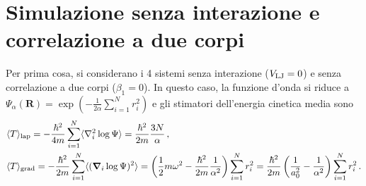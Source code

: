 \documentclass[a4paper, titlepage]{article}
\begin{document}
\section{Simulazione senza interazione e correlazione a due corpi}
Per prima cosa, si considerano i 4 sistemi senza interazione ($V_{\rm LJ} = 0$) e senza correlazione a due corpi ($\beta_1 = 0$). In questo caso, la funzione d'onda si riduce a $\Psi_\alpha(\mathbf{R}) = \exp(-\frac{1}{2\alpha}\sum_{i = 1}^Nr_i^2)$ e gli stimatori dell'energia cinetica media sono
\begin{align*}
    &\langle T \rangle _{\rm lap} = -\frac{\hbar^2}{4m}
    \sum_{i = 1}^N
    \langle\nabla_i^2\log\Psi\rangle = \frac{\hbar^2}{2m} \frac{3N}{\alpha}\, ,\\
    &\langle T \rangle _{\rm grad} = -\frac{\hbar^2}{2m}
    \sum_{i = 1}^N
    \langle(\boldsymbol{\nabla}_i\log\Psi)^2\rangle =
    \left(\frac{1}{2}m\omega^2 -  \frac{\hbar^2}{2m} \frac{1}{\alpha^2}\right)
    \sum_{i=1}^N r_i^2 = \frac{\hbar^2}{2m} \left(\frac{1}{a_0^2} - \frac{1}{\alpha^2}\right)\sum_{i=1}^N r_i^2\, .
\end{align*}
\end{document}
